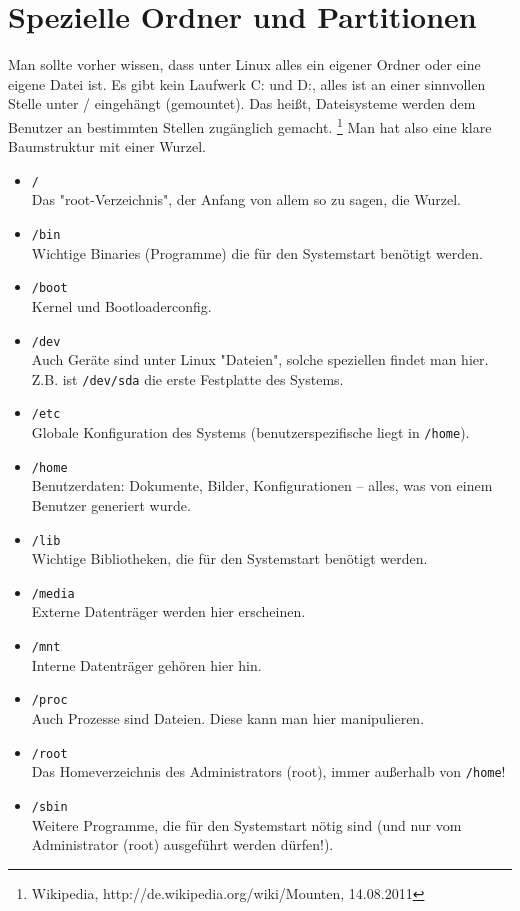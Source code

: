 \documentclass[a4paper,12pt]{article}
\begin{document}
\section{Spezielle Ordner und Partitionen}
Man sollte vorher wissen, dass unter Linux alles ein eigener Ordner oder 
eine eigene Datei ist. Es gibt kein Laufwerk C: und D:, alles ist 
an einer sinnvollen Stelle unter / eingehängt (gemountet). Das heißt, 
Dateisysteme werden dem Benutzer an bestimmten Stellen zugänglich gemacht.
\footnote{Wikipedia, http://de.wikipedia.org/wiki/Mounten, 14.08.2011}
Man hat also eine klare Baumstruktur mit einer Wurzel.
\begin{itemize}
\item \texttt{/} \\ Das "root-Verzeichnis", der Anfang von allem so zu sagen, die Wurzel.
\item \texttt{/bin} \\ Wichtige Binaries (Programme) die für den Systemstart benötigt werden.
\item \texttt{/boot} \\ Kernel und Bootloaderconfig.
\item \texttt{/dev} \\ Auch Geräte sind unter Linux "Dateien", solche 
speziellen findet man hier. Z.B. ist \texttt{/dev/sda} die erste Festplatte des Systems.
\item \texttt{/etc} \\ Globale Konfiguration des Systems (benutzerspezifische liegt in \texttt{/home}).
\item \texttt{/home} \\ Benutzerdaten: Dokumente, Bilder, Konfigurationen -- alles, was von einem Benutzer generiert wurde.
\item \texttt{/lib} \\ Wichtige Bibliotheken, die für den Systemstart benötigt werden.
\item \texttt{/media} \\ Externe Datenträger werden hier erscheinen.
\item \texttt{/mnt} \\ Interne Datenträger gehören hier hin.
\item \texttt{/proc} \\ Auch Prozesse sind Dateien. Diese kann man hier manipulieren.
\item \texttt{/root} \\ Das Homeverzeichnis des Administrators (root), immer außerhalb von \texttt{/home}!
\item \texttt{/sbin} \\ Weitere Programme, die für den Systemstart nötig sind (und nur vom Administrator (root) ausgeführt werden dürfen!).

\end{itemize}
\end{document}
